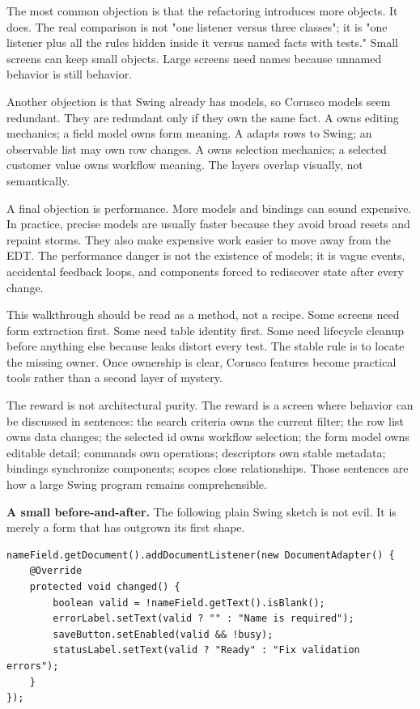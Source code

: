 The most common objection is that the refactoring introduces more objects. It does. The real comparison is not "one listener versus three classes"; it is "one listener plus all the rules hidden inside it versus named facts with tests." Small screens can keep small objects. Large screens need names because unnamed behavior is still behavior.

Another objection is that Swing already has models, so Corusco models seem redundant. They are redundant only if they own the same fact. A  owns editing mechanics; a field model owns form meaning. A  adapts rows to Swing; an observable list may own row changes. A  owns selection mechanics; a selected customer value owns workflow meaning. The layers overlap visually, not semantically.

A final objection is performance. More models and bindings can sound expensive. In practice, precise models are usually faster because they avoid broad resets and repaint storms. They also make expensive work easier to move away from the EDT. The performance danger is not the existence of models; it is vague events, accidental feedback loops, and components forced to rediscover state after every change.

This walkthrough should be read as a method, not a recipe. Some screens need form extraction first. Some need table identity first. Some need lifecycle cleanup before anything else because leaks distort every test. The stable rule is to locate the missing owner. Once ownership is clear, Corusco features become practical tools rather than a second layer of mystery.

The reward is not architectural purity. The reward is a screen where behavior can be discussed in sentences: the search criteria owns the current filter; the row list owns data changes; the selected id owns workflow selection; the form model owns editable detail; commands own operations; descriptors own stable metadata; bindings synchronize components; scopes close relationships. Those sentences are how a large Swing program remains comprehensible.

\textbf{A small before-and-after.} The following plain Swing sketch is not evil. It is merely a form that has outgrown its first shape.

\begin{lstlisting}[caption={A listener doing too many jobs.}]
nameField.getDocument().addDocumentListener(new DocumentAdapter() {
    @Override
    protected void changed() {
        boolean valid = !nameField.getText().isBlank();
        errorLabel.setText(valid ? "" : "Name is required");
        saveButton.setEnabled(valid && !busy);
        statusLabel.setText(valid ? "Ready" : "Fix validation errors");
    }
});
\end{lstlisting}

